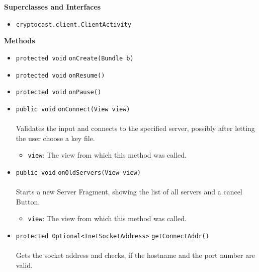 \textbf{\sffamily Superclasses and Interfaces}
\begin{itemize}
\item \lstinline|cryptocast.client.ClientActivity|
\end{itemize}



\textbf{\sffamily Methods}
\begin{itemize}
\item \lstinline|protected void| \lstinline|onCreate|\lstinline|(Bundle b)| \\[-0.6em]




\item \lstinline|protected void| \lstinline|onResume|\lstinline|()| \\[-0.6em]




\item \lstinline|protected void| \lstinline|onPause|\lstinline|()| \\[-0.6em]




\item \lstinline|public void| \lstinline|onConnect|\lstinline|(View view)|\\ \\[-0.6em]
Validates the input and connects to the specified server,
 possibly after letting the user choose a key file.
\begin{itemize}
\item \lstinline|view|: The view from which this method was called.
\end{itemize}



\item \lstinline|public void| \lstinline|onOldServers|\lstinline|(View view)|\\ \\[-0.6em]
Starts a new Server Fragment, showing the list of all servers and a cancel Button.
\begin{itemize}
\item \lstinline|view|: The view from which this method was called.
\end{itemize}



\item \lstinline|protected Optional<InetSocketAddress>| \lstinline|getConnectAddr|\lstinline|()|\\ \\[-0.6em]
Gets the socket address and checks, if the hostname and the port number are valid.


\end{itemize}
